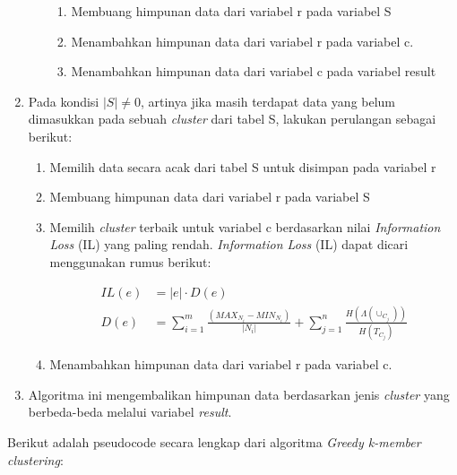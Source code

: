 \begin{enumerate}
\begin{enumerate}
\begin{enumerate}
\item Membuang himpunan data dari variabel r pada variabel S

\item Menambahkan himpunan data dari variabel r pada variabel c.

\item Menambahkan himpunan data dari variabel c pada variabel result

\end{enumerate}

\end{enumerate}

\item Pada kondisi $|S| \neq  0$, artinya jika masih terdapat data yang belum dimasukkan pada sebuah \textit{cluster} dari tabel S, lakukan perulangan sebagai berikut:

\begin{enumerate}
\item Memilih data secara acak dari tabel S untuk disimpan pada variabel r

\item Membuang himpunan data dari variabel r pada variabel S

\item Memilih \textit{cluster} terbaik untuk variabel c berdasarkan nilai \textit{Information Loss} (IL) yang paling rendah. \textit{Information Loss} (IL) dapat dicari menggunakan rumus berikut:

\begin{align*}
IL(e)&= |e| \cdot D(e) \\
D(e) &= \sum_{i=1}^{m} \frac{(MAX_{N_i} - MIN_{N_i})}{|N_i|} + \sum_{j=1}^{n}\frac{H(\Lambda(\cup_{C_j}))}{H(T_{C_j})}
\end{align*}

\item Menambahkan himpunan data dari variabel r pada variabel c.

\end{enumerate}

\item Algoritma ini mengembalikan himpunan data berdasarkan jenis \textit{cluster} yang berbeda-beda melalui variabel \textit{result}.

\end{enumerate}

\newpage
\noindent Berikut adalah pseudocode secara lengkap dari algoritma \textit{Greedy k-member clustering}:

